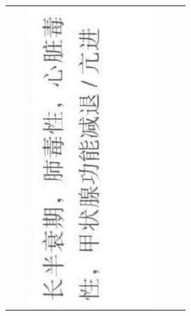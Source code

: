 \documentclass[10pt]{article}
\begin{document}
\begin{center}
\begin{tabular}{|c|c|c|c|c|c|}
 &  & \includegraphics[max width=\textwidth]{2024_07_05_645bb794a4d4f32ee0c8g-352(1)}

\end{tabular}
\end{center}
\end{document}
